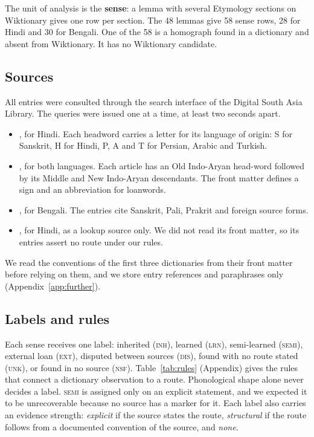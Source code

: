 \documentclass[11pt]{article}
\newcommand{\lbl}[1]{\textsc{#1}}
\begin{document}
The unit of analysis is the \textbf{sense}: a lemma with several Etymology sections on Wiktionary gives one row per section. The 48 lemmas give 58 sense rows, 28 for Hindi and 30 for Bengali. One of the 58 is a homograph found in a dictionary and absent from Wiktionary. It has no Wiktionary candidate.

\subsection{Sources}

All entries were consulted through the search interface of the Digital South Asia Library. The queries were issued one at a time, at least two seconds apart.
\begin{itemize}
\item \textbf{\citet{platts1884}}, for Hindi. Each headword carries a letter for its language of origin: S for Sanskrit, H for Hindi, P, A and T for Persian, Arabic and Turkish.
\item \textbf{\citet{turner1966cdial}}, for both languages. Each article has an Old Indo-Aryan head-word followed by its Middle and New Indo-Aryan descendants. The front matter defines a sign and an abbreviation for loanwords.
\item \textbf{\citet{dasa1937bangala}}, for Bengali. The entries cite Sanskrit, Pali, Prakrit and foreign source forms.
\item \textbf{\citet{dasa1975sabdasagara}}, for Hindi, as a lookup source only. We did not read its front matter, so its entries assert no route under our rules.
\end{itemize}
We read the conventions of the first three dictionaries from their front matter before relying on them, and we store entry references and paraphrases only (Appendix~\ref{app:further}).

\subsection{Labels and rules}

Each sense receives one label: inherited (\lbl{inh}), learned (\lbl{lrn}), semi-learned (\lbl{semi}), external loan (\lbl{ext}), disputed between sources (\lbl{dis}), found with no route stated (\lbl{unk}), or found in no source (\lbl{nsf}). Table~\ref{tab:rules} (Appendix) gives the rules that connect a dictionary observation to a route. Phonological shape alone never decides a label. \lbl{semi} is assigned only on an explicit statement, and we expected it to be unrecoverable because no source has a marker for it. Each label also carries an evidence strength: \textit{explicit} if the source states the route, \textit{structural} if the route follows from a documented convention of the source, and \textit{none}.
\end{document}
